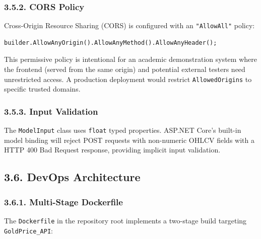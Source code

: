\subsubsection{3.5.2. CORS Policy}
Cross-Origin Resource Sharing (CORS) is configured with an \texttt{"AllowAll"} policy:
\begin{lstlisting}
builder.AllowAnyOrigin().AllowAnyMethod().AllowAnyHeader();
\end{lstlisting}
This permissive policy is intentional for an academic demonstration system where the frontend (served from the same origin) and potential external testers need unrestricted access. A production deployment would restrict \texttt{AllowedOrigins} to specific trusted domains.

\subsubsection{3.5.3. Input Validation}
The \texttt{ModelInput} class uses \texttt{float} typed properties. ASP.NET Core's built-in model binding will reject POST requests with non-numeric OHLCV fields with a HTTP 400 Bad Request response, providing implicit input validation.

\subsection{3.6. DevOps Architecture}

\subsubsection{3.6.1. Multi-Stage Dockerfile}
The \texttt{Dockerfile} in the repository root implements a two-stage build targeting \texttt{GoldPrice\_API}:

